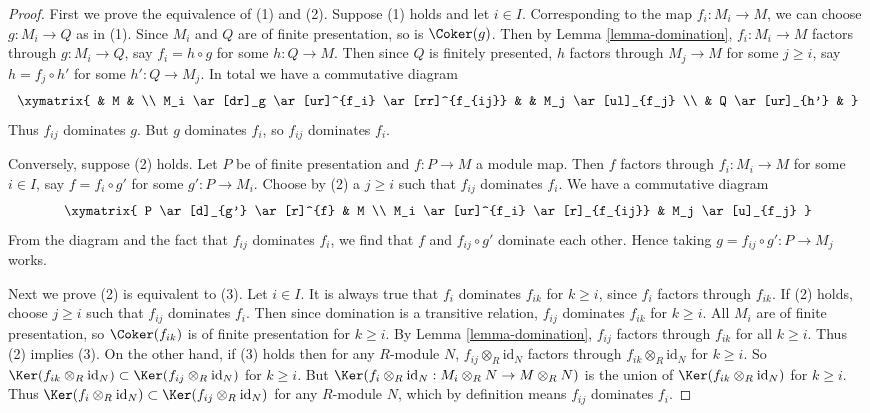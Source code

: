 \begin{proof}
First we prove the equivalence of (1) and (2).  Suppose (1) holds and let $i
\in I$. Corresponding to the map $f_i: M_i \to M$, we can choose $g:
M_i \to Q$ as in (1).  Since $M_i$ and $Q$ are of finite presentation,
so is $\Coker(g)$.  Then by Lemma \ref{lemma-domination}, $f_i : M_i
\to M$ factors through $g: M_i \to Q$, say $f_i = h \circ g$
for some $h: Q \to M$.  Then since $Q$ is finitely presented, $h$
factors through $M_j \to M$ for some $j \geq i$, say $h = f_j \circ h'$
for some $h': Q \to M_j$.  In total we have a commutative diagram
$$
\xymatrix{
  &  M  & \\
M_i \ar[dr]_g \ar[ur]^{f_i} \ar[rr]^{f_{ij}} &
& M_j \ar[ul]_{f_j} \\
  & Q  \ar[ur]_{h'} &
}
$$
Thus $f_{ij}$ dominates $g$.  But $g$ dominates $f_i$, so $f_{ij}$ dominates
$f_i$.

\medskip\noindent
Conversely, suppose (2) holds.  Let $P$ be of finite presentation and $f: P
\to M$ a module map.  Then $f$ factors through $f_i: M_i \to M$
for some $i \in I$, say $f = f_i \circ g'$ for some $g': P \to M_i$.
Choose by (2) a $j \geq i$ such that $f_{ij}$ dominates $f_i$.  We have a
commutative diagram
$$
\xymatrix{
P \ar[d]_{g'} \ar[r]^{f}           & M  \\
M_i \ar[ur]^{f_i} \ar[r]_{f_{ij}} & M_j \ar[u]_{f_j}
}
$$
From the diagram and the fact that $f_{ij}$ dominates $f_i$, we find that $f$
and $f_{ij} \circ g'$ dominate each other.  Hence taking $g = f_{ij} \circ g' :
P \to M_j$ works.

\medskip\noindent
Next we prove (2) is equivalent to (3).  Let $i \in I$.  It is always true that
$f_i$ dominates $f_{ik}$ for $k \geq i$, since $f_i$ factors through
$f_{ik}$.  If (2) holds, choose $j \geq i$ such that $f_{ij}$ dominates
$f_i$.  Then since domination is a transitive relation, $f_{ij}$ dominates
$f_{ik}$ for $k \geq i$. All $M_i$ are of finite presentation, so
$\Coker(f_{ik})$ is of finite presentation for $k \geq i$.  By Lemma
\ref{lemma-domination}, $f_{ij}$ factors through $f_{ik}$ for all $k \geq i$.
Thus (2) implies (3).  On the other hand, if (3) holds then for any $R$-module
$N$, $f_{ij} \otimes_R \text{id}_N$ factors through $f_{ik}
\otimes_R \text{id}_N$ for $k \geq i$.  So $\Ker(f_{ik} \otimes_R
\text{id}_N) \subset \Ker(f_{ij} \otimes_R \text{id}_N)$ for $k
\geq i$.  But $\Ker(f_i \otimes_R \text{id}_N: M_i \otimes_R N
\to M \otimes_R N)$ is the union of $\Ker(f_{ik} \otimes_R
\text{id}_N)$ for $k \geq i$.  Thus $\Ker(f_i \otimes_R
\text{id}_N) \subset \Ker(f_{ij} \otimes_R \text{id}_N)$ for
any $R$-module $N$, which by definition means $f_{ij}$ dominates $f_i$.


\end{proof}
